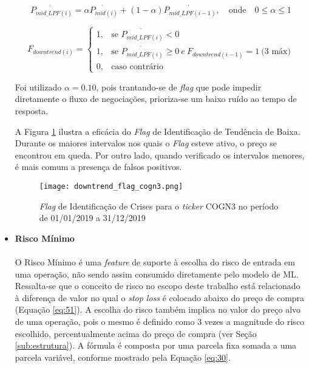 \begin{itemize}
    \begin{equation} \label{eq:24}
        \dot{P_{mid\_LPF(i)}} = \alpha \dot{P_{mid(i)}} + (1 - \alpha) \dot{P_{mid\_LPF(i-1)}},  \quad \textrm{onde} \quad 0 \le \alpha \le 1
    \end{equation}

    \begin{equation} \label{eq:25}
        F_{downtrend(i)} = \begin{cases} 1, & \mbox{se } \dot{P_{mid\_LPF(i)}} < 0 \\
            1, & \mbox{se } \dot{P_{mid\_LPF(i)}} \ge 0 \  e \  F_{downtrend(i-1)} = 1 \  \textrm{(3 m\'ax)} \\
            0, & \mbox{caso contr\'ario} \end{cases}
    \end{equation}

    Foi utilizado \begin{math} \alpha = 0.10 \end{math}, pois trantando-se de \textit{flag} que pode impedir diretamente o fluxo de negociações, prioriza-se um baixo ruído ao tempo de resposta.

    A Figura \ref{fig:109} ilustra a eficácia do \textit{Flag} de Identificação de Tendência de Baixa. Durante os maiores intervalos nos quais o \textit{Flag} esteve ativo, o preço se encontrou em queda. Por outro lado, quando verificado os intervalos menores, é mais comum a presença de falsos positivos.

    \begin{figure}[h]
        \texttt{[image: downtrend\_flag\_cogn3.png]}
        \centering
        \caption{\textit{Flag} de Identificação de Crises para o \textit{ticker} COGN3 no período de 01/01/2019 a 31/12/2019}
        \label{fig:109}
    \end{figure}

    \item \textbf{Risco Mínimo} \\ \\
    O Risco Mínimo é uma \textit{feature} de suporte à escolha do risco de entrada em uma operação, não sendo assim consumido diretamente pelo modelo de ML. Ressalta-se que o conceito de risco no escopo deste trabalho está relacionado à diferença de valor no qual o \textit{stop loss} é colocado abaixo do preço de compra (Equação \ref{eq:51}). A escolha do risco também implica no valor do preço alvo de uma operação, pois o mesmo é definido como 3 vezes a magnitude do risco escolhido, percentualmente acima do preço de compra (ver Seção \ref{sub:estrutura}). A fórmula é composta por uma parcela fixa somada a uma parcela variável, conforme mostrado pela Equação \ref{eq:30}.


\end{itemize}
